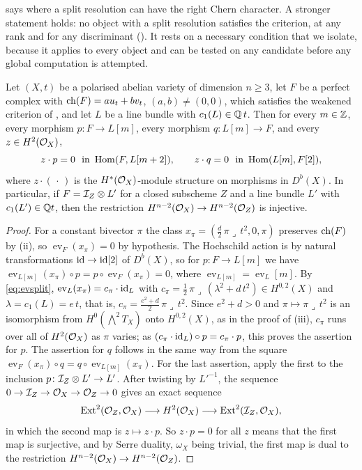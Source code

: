  says where a split resolution can have the right
Chern character. A stronger statement holds: no object with a split
resolution satisfies the criterion, at any rank and for any discriminant
(). It
rests on a necessary condition that we isolate, because it applies to
every object and can be tested on any candidate before any global
computation is attempted.

\begin{lemma}
\label{lem:annihilation}
Let $(X,t)$ be a polarised abelian variety of dimension $n\ge3$, let $F$ be
a perfect complex with $\operatorname{ch}(F)=au_{t}+bv_{t}$, $(a,b)\ne(0,0)$, which
satisfies the weakened criterion of , and let $L$ be a
line bundle with $c_{1}(L)\in\mathbb{Q}\,t$. Then for every $m\in\mathbb{Z}$, every
morphism $p\colon F\to L[m]$, every morphism $q\colon L[m]\to F$, and every
$z\in H^{2}(\mathcal{O}_{X})$,
\[
  z\cdot p=0\ \ \text{in }\operatorname{Hom}(F,L[m+2]),\qquad
  z\cdot q=0\ \ \text{in }\operatorname{Hom}(L[m],F[2]),
\]
where $z\cdot(\,\cdot\,)$ is the $H^{*}(\mathcal{O}_{X})$-module structure on
morphisms in $D^{b}(X)$. In particular, if $F=\mathcal{I}_{Z}\otimes L'$ for a closed
subscheme $Z$ and a line bundle $L'$ with $c_{1}(L')\in\mathbb{Q} t$, then the
restriction $H^{n-2}(\mathcal{O}_{X})\to H^{n-2}(\mathcal{O}_{Z})$ is injective.
\end{lemma}

\begin{proof}
For a constant bivector $\pi$ the class
$x_{\pi}=(\tfrac d2\,\pi\lrcorner\,t^{2},0,\pi)$ preserves $\operatorname{ch}(F)$ by
(ii), so $\operatorname{ev}_{F}(x_{\pi})=0$ by hypothesis.
The Hochschild action is by natural transformations $\operatorname{id}\to\operatorname{id}[2]$ of
$D^{b}(X)$, so for $p\colon F\to L[m]$ we have
$\operatorname{ev}_{L[m]}(x_{\pi})\circ p=p\circ\operatorname{ev}_{F}(x_{\pi})=0$,
where $\operatorname{ev}_{L[m]}=\operatorname{ev}_{L}[m]$. By
\eqref{eq:evsplit}, $\operatorname{ev}_{L}(x_{\pi})=c_{\pi}\cdot\operatorname{id}_{L}$ with
$c_{\pi}=\tfrac12\,\pi\lrcorner\,(\lambda^{2}+d\,t^{2})\in H^{0,2}(X)$ and
$\lambda=c_{1}(L)=e\,t$, that is,
$c_{\pi}=\tfrac{e^{2}+d}{2}\,\pi\lrcorner\,t^{2}$. Since $e^{2}+d>0$ and
$\pi\mapsto\pi\lrcorner\,t^{2}$ is an isomorphism from
$H^{0}(\bigwedge^{2}T_{X})$ onto $H^{0,2}(X)$, as in the proof of
(iii), $c_{\pi}$ runs over all of $H^{2}(\mathcal{O}_{X})$ as $\pi$
varies; as $(c_{\pi}\cdot\operatorname{id}_{L})\circ p=c_{\pi}\cdot p$, this proves the
assertion for $p$. The assertion for $q$ follows in the same way from the
square
$\operatorname{ev}_{F}(x_{\pi})\circ q=q\circ\operatorname{ev}_{L[m]}(x_{\pi})$.
For the last assertion, apply the first to the inclusion
$p\colon\mathcal{I}_{Z}\otimes L'\to L'$. After twisting by $L'^{-1}$, the sequence
$0\to\mathcal{I}_{Z}\to\mathcal{O}_{X}\to\mathcal{O}_{Z}\to0$ gives an exact sequence
\[
  \operatorname{Ext}^{2}(\mathcal{O}_{Z},\mathcal{O}_{X})\longrightarrow H^{2}(\mathcal{O}_{X})
  \longrightarrow\operatorname{Ext}^{2}(\mathcal{I}_{Z},\mathcal{O}_{X}),
\]
in which the second map is $z\mapsto z\cdot p$. So $z\cdot p=0$ for all $z$
means that the first map is surjective, and by Serre duality, $\omega_{X}$
being trivial, the first map is dual to the restriction
$H^{n-2}(\mathcal{O}_{X})\to H^{n-2}(\mathcal{O}_{Z})$.
\end{proof}


